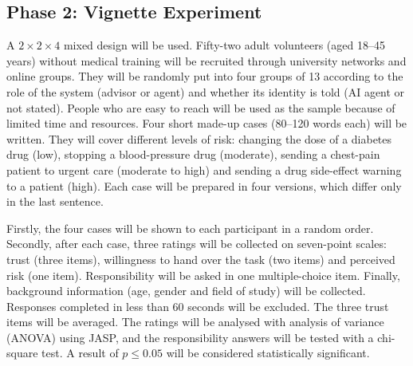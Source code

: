 \subsection{Phase 2: Vignette Experiment}
\label{sec:protocol}

A $2\times2\times4$ mixed design will be used. Fifty-two adult volunteers (aged 18--45 years) without medical training will be recruited through university networks and online groups. They will be randomly put into four groups of 13 according to the role of the system (advisor or agent) and whether its identity is told (AI agent or not stated). People who are easy to reach will be used as the sample because of limited time and resources. Four short made-up cases (80--120 words each) will be written. They will cover different levels of risk: changing the dose of a diabetes drug (low), stopping a blood-pressure drug (moderate), sending a chest-pain patient to urgent care (moderate to high) and sending a drug side-effect warning to a patient (high). Each case will be prepared in four versions, which differ only in the last sentence.

Firstly, the four cases will be shown to each participant in a random order. Secondly, after each case, three ratings will be collected on seven-point scales: trust (three items), willingness to hand over the task (two items) and perceived risk (one item). Responsibility will be asked in one multiple-choice item. Finally, background information (age, gender and field of study) will be collected. Responses completed in less than 60 seconds will be excluded. The three trust items will be averaged. The ratings will be analysed with analysis of variance (ANOVA) using JASP, and the responsibility answers will be tested with a chi-square test. A result of $p\leq0.05$ will be considered statistically significant.
